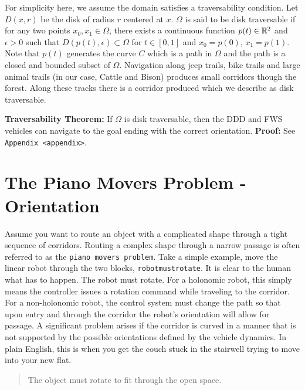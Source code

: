 For simplicity here, we assume the domain satisfies a traversability
condition. Let \(D(x,r)\) be the disk of radius \(r\) centered at \(x\).
\(\Omega\) is said to be disk traversable if for any two points
\(x_0,x_1 \in \Omega\), there exists a continuous function
\(p(t)\in{\Bbb R}^2\) and \(\epsilon >0\) such that
\(D(p(t),\epsilon)\subset\Omega\) for \(t\in [0,1]\) and \(x_0=p(0)\),
\(x_1=p(1)\). Note that \(p(t)\) generates the curve \(C\) which is a
path in \(\Omega\) and the path is a closed and bounded subset of
\(\Omega\). Navigation along jeep trails, bike trails and large animal
trails (in our case, Cattle and Bison) produces small corridors though
the forest. Along these tracks there is a corridor produced which we
describe as disk traversable.

\leavevmode\hypertarget{disktraverseDDD}{}%
\textbf{Traversability Theorem:} If \(\Omega\) is disk traversable, then
the DDD and FWS vehicles can navigate to the goal ending with the
correct orientation. \textbf{Proof:} See
\texttt{Appendix\ \textless{}appendix\textgreater{}}.

\hypertarget{the-piano-movers-problem---orientation}{%
\section{The Piano Movers Problem -
Orientation}\label{the-piano-movers-problem---orientation}}

Assume you want to route an object with a complicated shape through a
tight sequence of corridors. Routing a complex shape through a narrow
passage is often referred to as the \texttt{piano\ movers\ problem}.
Take a simple example, move the linear robot through the two blocks,
\texttt{robotmustrotate}. It is clear to the human what has to happen.
The robot must rotate. For a holonomic robot, this simply means the
controller issues a rotation command while traveling to the corridor.
For a non-holonomic robot, the control system must change the path so
that upon entry and through the corridor the robot's orientation will
allow for passage. A significant problem arises if the corridor is
curved in a manner that is not supported by the possible orientations
defined by the vehicle dynamics. In plain English, this is when you get
the couch stuck in the stairwell trying to move into your new flat.

\begin{quote}
The object must rotate to fit through the open space.
\end{quote}

